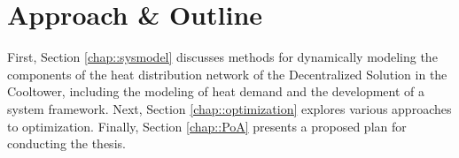 \section{Approach \& Outline}
First, Section \ref{chap::sysmodel} discusses methods for dynamically modeling the components of the heat distribution network of the Decentralized Solution in the Cooltower, including the modeling of heat demand and the development of a system framework. Next, Section \ref{chap::optimization} explores various approaches to optimization. Finally, Section \ref{chap::PoA} presents a proposed plan for conducting the thesis.







